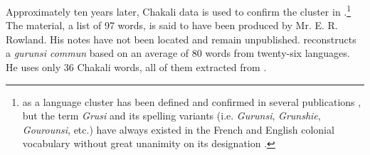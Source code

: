 Approximately ten years later, Chakali data is used to confirm the 
cluster in \citet{Bend65}.\footnote{  as a language cluster 
has been defined and confirmed in several publications \citep{Dela12, Kohl58, 
Bend65, Mane69a, Mane69b, Klei97}, but  the term  {\it {}Grusi} and its 
spelling variants (i.e. {\it Gurunsi}, {\it Grunshie}, {\it Gourounsi}, etc.)  
have always existed in the French and English colonial vocabulary without great 
unanimity on its designation \citep{Taux21, Taux24, Ratt32a, Ratt32b, Nico52, 
Dupe84}. }  The material, a list of 97 words, is said to have been produced by  
Mr. E. R. Rowland.  His notes have not been located and remain unpublished.  
\citet{Mane69a, Mane69b} reconstructs  a {\it  gurunsi commun}  based on an 
average of 80 words from twenty-six  languages.  He uses  
only 36 Chakali words, all of them extracted from \citet{Bend65}. 

